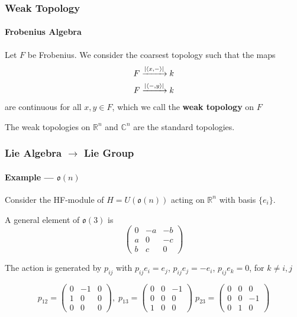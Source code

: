 \documentclass{beamer}
\begin{document}
\begin{frame}

\frametitle{Weak Topology}

\framesubtitle{Frobenius Algebra}

Let $F$ be Frobenius. We consider the coarsest topology such that the maps
\begin{equation*}
\begin{split}
F \xrightarrow{| \left\langle x, - \right\rangle  |} k \\
F \xrightarrow{|  \left\langle -, y \right\rangle | } k
\end{split}
\end{equation*}
are continuous for all $x,y \in F$, which we call the \textbf{weak topology} on $F$

\medskip

 The weak topologies on $\mathbb{R}^n$ and $\mathbb{C}^n$ are the standard topologies.

\end{frame}






\begin{frame}
\frametitle{Lie Algebra $\to$ Lie Group}

\framesubtitle{Example ---  $\mathfrak{o}(n)$}


Consider the HF-module of $H = U(\mathfrak{o}(n))$ acting on $\mathbb{R}^n$ with basis $\{ e_i \}$.

\bigskip

A general element of $\mathfrak{o}(3)$ is
\begin{equation*}
\begin{pmatrix}
0 & -a & -b \\
a & 0 & -c \\
b & c & 0
\end{pmatrix}
\end{equation*}

 The action is generated by $p_{ij}$ with $p_{ij} e_i = e_j$, $p_{ij} e_j = - e_i$, $p_{ij} e_k = 0$, for $k \ne i,j$


\begin{equation*}
p_{12} = \begin{pmatrix}
0 & -1 & 0 \\
1 & 0 & 0 \\
0 & 0 & 0
\end{pmatrix}, \; p_{13} = \begin{pmatrix}
0 & 0 & -1 \\
0 & 0 & 0 \\
1 & 0 & 0
\end{pmatrix} \; p_{23} = \begin{pmatrix}
0 & 0 & 0 \\
0 & 0 & -1 \\
0 & 1 & 0
\end{pmatrix}
\end{equation*}




\end{frame}
\end{document}
